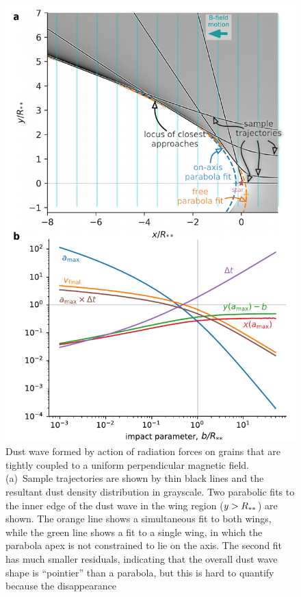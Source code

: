 \begin{figure}
  \centering
  \includegraphics[width=\linewidth]{figs/perp-bfield-dust-wave-inertia}
  \caption{Dust wave formed by action of radiation forces on grains
    that are tightly coupled to a uniform perpendicular magnetic
    field.  (a)~Sample trajectories are shown by thin black lines and
    the resultant dust density distribution in grayscale.  Two
    parabolic fits to the inner edge of the dust wave in the wing
    region (\(y > R_{**}\)) are shown. The orange line shows a
    simultaneous fit to both wings, while the green line shows a fit
    to a single wing, in which the parabola apex is not constrained to
    lie on the axis.  The second fit has much smaller residuals,
    indicating that the overall dust wave shape is ``pointier'' than a
    parabola, but this is hard to quantify because the disappearance
}
\end{figure}
